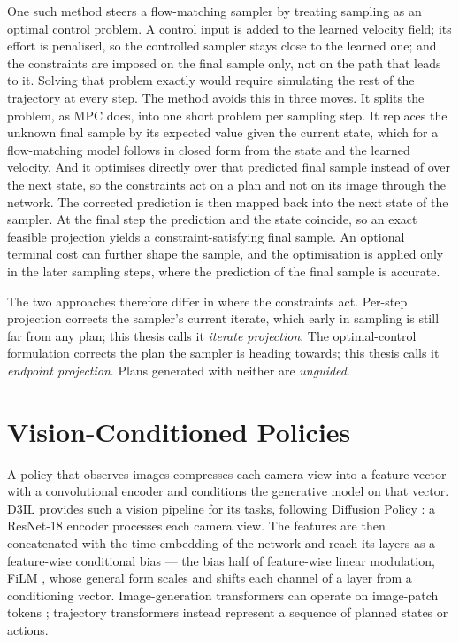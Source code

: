 One such method \parencite{li2025hardflow} steers a flow-matching sampler by treating sampling as an
optimal control problem. A control input is added to the learned velocity field; its effort is penalised, so
the controlled sampler stays close to the learned one; and the constraints are imposed on the final
sample only, not on the path that leads to it. Solving that problem exactly would require simulating
the rest of the trajectory at every step. The method avoids this in three moves. It splits the problem,
as \ac{MPC} does, into one short problem per sampling step. It replaces the unknown
final sample by its expected value given the current state, which for a flow-matching model follows in
closed form from the state and the learned velocity. And it optimises directly over that predicted
final sample instead of over the next state, so the constraints act on a plan and not on its image
through the network. The corrected prediction is then mapped back into the next state of the sampler.
At the final step the prediction and the state coincide, so an exact feasible projection yields a
constraint-satisfying final sample. An optional terminal cost can further shape the sample, and the optimisation is applied only
in the later sampling steps, where the prediction of the final sample is accurate.

The two approaches therefore differ in where the constraints act. Per-step projection corrects the
sampler's current iterate, which early in sampling is still far from any plan; this thesis calls it
\emph{iterate projection}. The optimal-control formulation corrects the plan the sampler is heading
towards; this thesis calls it \emph{endpoint projection}. Plans generated with neither are \emph{unguided}.

\section{Vision-Conditioned Policies}\label{sec:bg:visual}

A policy that observes images compresses each camera view into a feature vector with a convolutional
encoder and conditions the generative model on that vector. D3IL \parencite{jia2024towards} provides
such a vision pipeline for its tasks, following Diffusion Policy \parencite{chi2023diffusion}: a
ResNet-18 encoder \parencite{he2016deep} processes each camera view. The features are then
concatenated with the time embedding of the network and reach its layers as a feature-wise
conditional bias --- the bias half of feature-wise linear modulation, \ac{FiLM}
\parencite[Sec.~3]{perez2017film}, whose general form scales and shifts each channel of a layer from
a conditioning vector. Image-generation transformers can operate on image-patch tokens \parencite{peebles2022dit};
trajectory transformers instead represent a sequence of planned states or actions.

